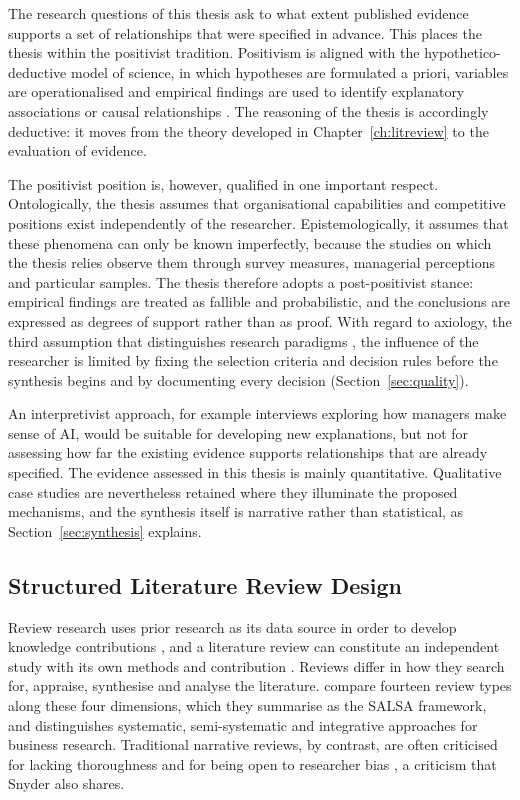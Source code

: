 The research questions of this thesis ask to what extent published evidence supports a set of relationships that were specified in advance. This places the thesis within the positivist tradition. Positivism is aligned with the hypothetico-deductive model of science, in which hypotheses are formulated a priori, variables are operationalised and empirical findings are used to identify explanatory associations or causal relationships \parencite{park2020}. The reasoning of the thesis is accordingly deductive: it moves from the theory developed in Chapter~\ref{ch:litreview} to the evaluation of evidence.

The positivist position is, however, qualified in one important respect. Ontologically, the thesis assumes that organisational capabilities and competitive positions exist independently of the researcher. Epistemologically, it assumes that these phenomena can only be known imperfectly, because the studies on which the thesis relies observe them through survey measures, managerial perceptions and particular samples. The thesis therefore adopts a post-positivist stance: empirical findings are treated as fallible and probabilistic, and the conclusions are expressed as degrees of support rather than as proof. With regard to axiology, the third assumption that distinguishes research paradigms \parencite{park2020}, the influence of the researcher is limited by fixing the selection criteria and decision rules before the synthesis begins and by documenting every decision (Section~\ref{sec:quality}).

An interpretivist approach, for example interviews exploring how managers make sense of AI, would be suitable for developing new explanations, but not for assessing how far the existing evidence supports relationships that are already specified. The evidence assessed in this thesis is mainly quantitative. Qualitative case studies are nevertheless retained where they illuminate the proposed mechanisms, and the synthesis itself is narrative rather than statistical, as Section~\ref{sec:synthesis} explains.

\subsection{Structured Literature Review Design}
\label{sec:design}

Review research uses prior research as its data source in order to develop knowledge contributions \parencite{kunisch2023}, and a literature review can constitute an independent study with its own methods and contribution \parencite{kraus2022}. Reviews differ in how they search for, appraise, synthesise and analyse the literature. \textcite{grant2009} compare fourteen review types along these four dimensions, which they summarise as the SALSA framework, and \textcite{snyder2019} distinguishes systematic, semi-systematic and integrative approaches for business research. Traditional narrative reviews, by contrast, are often criticised for lacking thoroughness and for being open to researcher bias \parencite{tranfield2003}, a criticism that Snyder also shares.

